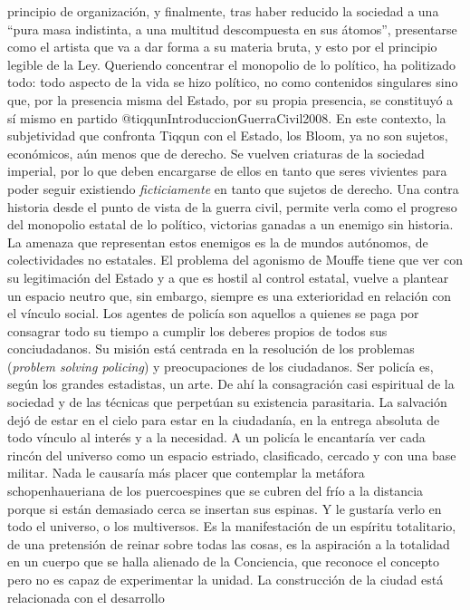 \documentclass[
]{article}
\begin{document}
principio de organización, y finalmente, tras haber reducido la sociedad
a una ``pura masa indistinta, a una multitud descompuesta en sus
átomos'', presentarse como el artista que va a dar forma a su materia
bruta, y esto por el principio legible de la Ley. Queriendo concentrar
el monopolio de lo político, ha politizado todo: todo aspecto de la vida
se hizo político, no como contenidos singulares sino que, por la
presencia misma del Estado, por su propia presencia, se constituyó a sí
mismo en partido @tiqqunIntroduccionGuerraCivil2008. En este contexto,
la subjetividad que confronta Tiqqun con el Estado, los Bloom, ya no son
sujetos, económicos, aún menos que de derecho. Se vuelven criaturas de
la sociedad imperial, por lo que deben encargarse de ellos en tanto que
seres vivientes para poder seguir existiendo \emph{ficticiamente} en
tanto que sujetos de derecho. Una contra historia desde el punto de
vista de la guerra civil, permite verla como el progreso del monopolio
estatal de lo político, victorias ganadas a un enemigo sin historia. La
amenaza que representan estos enemigos es la de mundos autónomos, de
colectividades no estatales. El problema del agonismo de Mouffe tiene
que ver con su legitimación del Estado y a que es hostil al control
estatal, vuelve a plantear un espacio neutro que, sin embargo, siempre
es una exterioridad en relación con el vínculo social. Los agentes de
policía son aquellos a quienes se paga por consagrar todo su tiempo a
cumplir los deberes propios de todos sus conciudadanos. Su misión está
centrada en la resolución de los problemas (\emph{problem solving
policing}) y preocupaciones de los ciudadanos. Ser policía es, según los
grandes estadistas, un arte. De ahí la consagración casi espiritual de
la sociedad y de las técnicas que perpetúan su existencia parasitaria.
La salvación dejó de estar en el cielo para estar en la ciudadanía, en
la entrega absoluta de todo vínculo al interés y a la necesidad. A un
policía le encantaría ver cada rincón del universo como un espacio
estriado, clasificado, cercado y con una base militar. Nada le causaría
más placer que contemplar la metáfora schopenhaueriana de los
puercoespines que se cubren del frío a la distancia porque si están
demasiado cerca se insertan sus espinas. Y le gustaría verlo en todo el
universo, o los multiversos. Es la manifestación de un espíritu
totalitario, de una pretensión de reinar sobre todas las cosas, es la
aspiración a la totalidad en un cuerpo que se halla alienado de la
Conciencia, que reconoce el concepto pero no es capaz de experimentar la
unidad. La construcción de la ciudad está relacionada con el desarrollo
\end{document}
